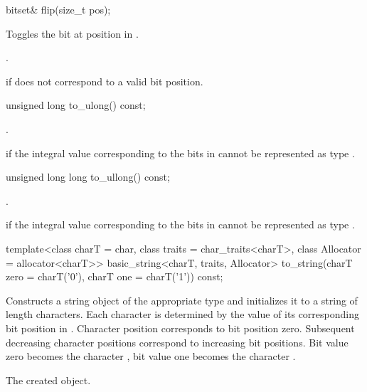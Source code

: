 %
\begin{itemdecl}
bitset& flip(size_t pos);
\end{itemdecl}

\begin{itemdescr}
\pnum
\effects
Toggles the bit at position  in
.

\pnum
\returns
{}.

\pnum
\throws
{}%
 if  does not correspond to a valid bit position.
\end{itemdescr}

%
\begin{itemdecl}
unsigned long to_ulong() const;
\end{itemdecl}

\begin{itemdescr}
\pnum
\returns
{}.

\pnum
\throws
{}%
 if the integral value 
corresponding to the bits in 
cannot be represented as type .
\end{itemdescr}

%
\begin{itemdecl}
unsigned long long to_ullong() const;
\end{itemdecl}

\begin{itemdescr}
\pnum
\returns
{}.

\pnum
\throws
{}%
 if the integral value 
corresponding to the bits in 
cannot be represented as type .
\end{itemdescr}

%
\begin{itemdecl}
template<class charT = char,
         class traits = char_traits<charT>,
         class Allocator = allocator<charT>>
  basic_string<charT, traits, Allocator>
    to_string(charT zero = charT('0'), charT one = charT('1')) const;
\end{itemdecl}

\begin{itemdescr}
\pnum
\effects
Constructs a string object of the appropriate type
and initializes it to a string of length  characters.
Each character is determined by the value of its corresponding bit position in
.
Character position  corresponds to bit position zero.
Subsequent decreasing character positions correspond to increasing bit
positions.
Bit value zero becomes the character ,
bit value one becomes the character
.

\pnum
\returns
The created object.
\end{itemdescr}

